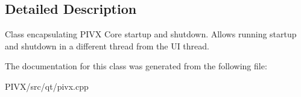 \subsection{Detailed Description}
Class encapsulating P\+I\+VX Core startup and shutdown. Allows running startup and shutdown in a different thread from the UI thread. 

The documentation for this class was generated from the following file\+:\begin{DoxyCompactItemize}
\item 
P\+I\+V\+X/src/qt/pivx.\+cpp\end{DoxyCompactItemize}
